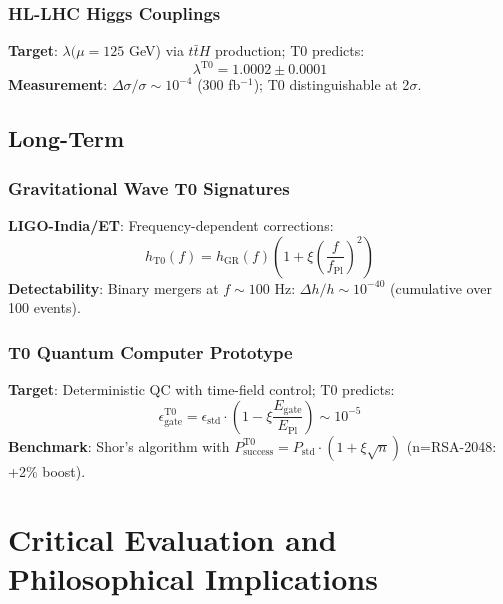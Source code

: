 	\subsubsection{HL-LHC Higgs Couplings}
	
	\textbf{Target}: $\lambda(\mu=125$ GeV) via $t\bar{t}H$ production; T0 predicts:
	\begin{equation}
		\lambda^{\text{T0}} = 1.0002 \pm 0.0001 \tag{ML-Eq.~6.3}
	\end{equation}
	\textbf{Measurement}: $\Delta\sigma/\sigma \sim 10^{-4}$ (300 fb$^{-1}$); T0 distinguishable at 2$\sigma$.
	
	\subsection{Long-Term}
	
	\subsubsection{Gravitational Wave T0 Signatures}
	
	\textbf{LIGO-India/ET}: Frequency-dependent corrections:
	\begin{equation}
		h_{\text{T0}}(f) = h_{\text{GR}}(f) \left(1 + \xi \left(\frac{f}{f_{\text{Pl}}}\right)^2\right) \tag{T0-Orig Eq.~8.1.2}
	\end{equation}
	\textbf{Detectability}: Binary mergers at $f\sim100$ Hz: $\Delta h/h \sim 10^{-40}$ (cumulative over 100 events).
	
	\subsubsection{T0 Quantum Computer Prototype}
	
	\textbf{Target}: Deterministic QC with time-field control; T0 predicts:
	\begin{equation}
		\epsilon_{\text{gate}}^{\text{T0}} = \epsilon_{\text{std}} \cdot \left(1 - \xi \frac{E_{\text{gate}}}{E_{\text{Pl}}}\right) \sim 10^{-5} \tag{T0-Orig Eq.~5.2.1}
	\end{equation}
	\textbf{Benchmark}: Shor's algorithm with $P_{\text{success}}^{\text{T0}} = P_{\text{std}} \cdot (1 + \xi\sqrt{n})$ (n=RSA-2048: +2\% boost).
	
	\section{Critical Evaluation and Philosophical Implications}
	

